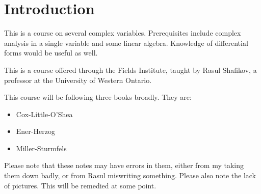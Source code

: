 \newpage
\section{Introduction \label{sec:intro}}

This is a course on several complex variables. Prerequisites include complex analysis in a single variable and some linear algebra. Knowledge of differential forms would be useful as well.

This is a course offered through the Fields Institute, taught by Rasul Shafikov, a professor at the University of Western Ontario.

This course will be following three books broadly. They are:
\begin{itemize}
    \item Cox-Little-O'Shea
    \item Ener-Herzog
    \item Miller-Sturmfels
\end{itemize}


Please note that these notes may have errors in them, either from my taking them down badly, or from Rasul miswriting something. Please also note the lack of pictures. This will be remedied at some point.






